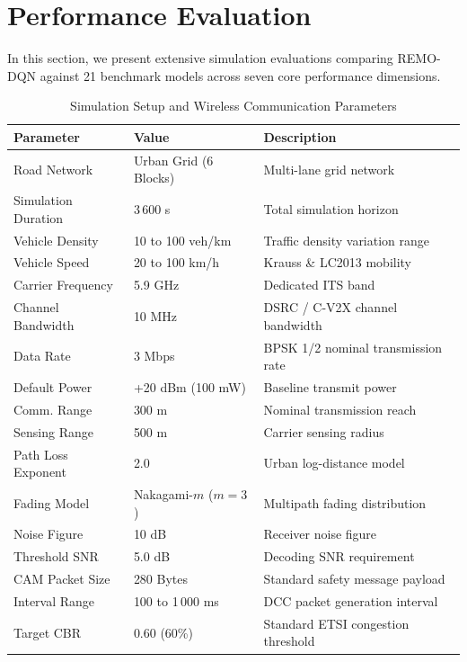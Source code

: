 \documentclass[journal]{IEEEtran}
\begin{document}
\section{Performance Evaluation}
In this section, we present extensive simulation evaluations comparing REMO-DQN against 21 benchmark models across seven core performance dimensions.

\begin{table}[t]
\caption{Simulation Setup and Wireless Communication Parameters}
\label{tab:sim_setup}
\centering
\scriptsize
\begin{tabularx}{\linewidth}{l l L}
\toprule
\textbf{Parameter} & \textbf{Value} & \textbf{Description} \\
\midrule
Road Network & Urban Grid (6 Blocks) & Multi-lane grid network \\
Simulation Duration & 3\,600 s & Total simulation horizon \\
Vehicle Density & 10 to 100 veh/km & Traffic density variation range \\
Vehicle Speed & 20 to 100 km/h & Krauss \& LC2013 mobility \\
Carrier Frequency & 5.9 GHz & Dedicated ITS band \\
Channel Bandwidth & 10 MHz & DSRC / C-V2X channel bandwidth \\
Data Rate & 3 Mbps & BPSK 1/2 nominal transmission rate \\
Default Power & +20 dBm (100 mW) & Baseline transmit power \\
Comm. Range & 300 m & Nominal transmission reach \\
Sensing Range & 500 m & Carrier sensing radius \\
Path Loss Exponent & 2.0 & Urban log-distance model \\
Fading Model & Nakagami-$m$ ($m=3$) & Multipath fading distribution \\
Noise Figure & 10 dB & Receiver noise figure \\
Threshold SNR & 5.0 dB & Decoding SNR requirement \\
CAM Packet Size & 280 Bytes & Standard safety message payload \\
Interval Range & 100 to 1\,000 ms & DCC packet generation interval \\
Target CBR & 0.60 (60\%) & Standard ETSI congestion threshold \\
\bottomrule
\end{tabularx}
\end{table}
\end{document}
